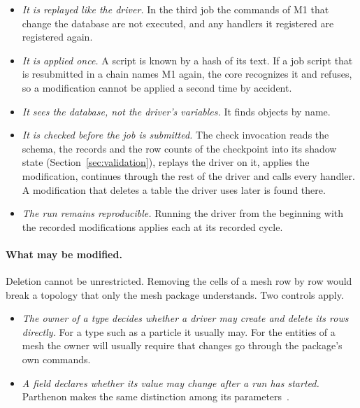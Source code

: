 \documentclass[11pt,a4paper]{article}
\begin{document}
\begin{itemize}
  \item \emph{It is replayed like the driver.}  In the third job the
        commands of M1 that change the database are not executed, and any
        handlers it registered are registered again.
  \item \emph{It is applied once.}  A script is known by a hash of its
        text.  If a job script that is resubmitted in a chain names M1
        again, the core recognizes it and refuses, so a modification cannot
        be applied a second time by accident.
  \item \emph{It sees the database, not the driver's variables.}  It finds
        objects by name.
  \item \emph{It is checked before the job is submitted.}  The check
        invocation reads the schema, the records and the row counts of the
        checkpoint into its shadow state (Section~\ref{sec:validation}),
        replays the driver on it, applies the modification, continues
        through the rest of the driver and calls every handler.  A
        modification that deletes a table the driver uses later is found
        there.
  \item \emph{The run remains reproducible.}  Running the driver from the
        beginning with the recorded modifications applies each at its
        recorded cycle.
\end{itemize}

\paragraph{What may be modified.}  Deletion cannot be unrestricted.
Removing the cells of a mesh row by row would break a topology that only
the mesh package understands.  Two controls apply.

\begin{itemize}
  \item \emph{The owner of a type decides whether a driver may create and
        delete its rows directly.}  For a type such as a particle it
        usually may.  For the entities of a mesh the owner will usually
        require that changes go through the package's own commands.
  \item \emph{A field declares whether its value may change after a run has
        started.}  Parthenon makes the same distinction among its
        parameters~\cite{parthenondocs}.
\end{itemize}
\end{document}
